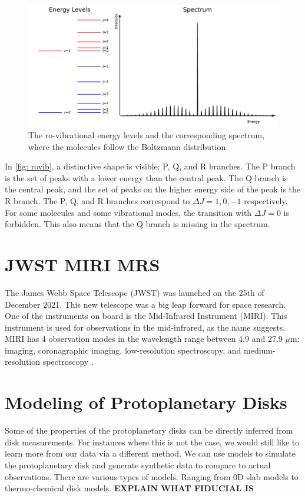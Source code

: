 \documentclass[twoside, single, authoryear, semicolon, 12pt]{lion-msc}
\newcommand{\4}{$_4$}
\newcommand{\3}{$_3$}
\newcommand{\2}{$_2$}
\begin{document}
\begin{figure}[H]
    \centering
    \includegraphics[width=\linewidth]{Figures/RoVibSpectrum.pdf}
    \caption{The ro-vibrational energy levels and the corresponding spectrum, where the molecules follow the Boltzmann distribution}
    \label{fig: rovib}
\end{figure}

In \autoref{fig: rovib}, a distinctive shape is visible: P, Q, and R branches. The P branch is the set of peaks with a lower energy than the central peak. The Q branch is the central peak, and the set of peaks on the higher energy side of the peak is the R branch. The P, Q, and R branches correspond to $\Delta J=1, 0, -1$ respectively. For some molecules and some vibrational modes, the transition with $\Delta J=0$ is forbidden. This also means that the Q branch is missing in the spectrum.

\section{JWST MIRI MRS}
The James Webb Space Telescope (JWST) was launched on the 25th of December 2021. This new telescope was a big leap forward for space research. One of the instruments on board is the Mid-Infrared Instrument (MIRI). This instrument is used for observations in the mid-infrared, as the name suggests. MIRI has 4 observation modes in the wavelength range between 4.9 and 27.9 $\mu$m:  imaging, coronagraphic imaging, low-resolution spectroscopy, and medium-resolution spectroscopy \citep{}. 

\section{Modeling of Protoplanetary Disks}
Some of the properties of the protoplanetary disks can be directly inferred from disk measurements. For instances where this is not the case, we would still like to learn more from our data via a different method. We can use models to simulate the protoplanetary disk and generate synthetic data to compare to actual observations. There are various types of models. Ranging from 0D slab models to thermo-chemical disk models. 
\textbf{EXPLAIN WHAT FIDUCIAL IS}
\end{document}
